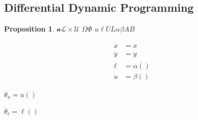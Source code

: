 \documentclass[conference]{IEEEtran}
\newtheorem{proposition}{Proposition}
\newcommand{\TODO}[1]{{\color{red} {{#1}}  }}
\begin{document}


\subsection{Differential Dynamic Programming}

\begin{proposition}
  $\mathcal{u}\mathcal{L} \times \mathcal{U}$ $\Omega \Phi$ $u \ell U L \alpha \beta A B $

\begin{align*}
  \dot x &= x \\
  \dot y &= y \\
  \dot\ell &= \alpha() \\
  \dot u &= \beta() 
\end{align*}

  $\dot{\theta}_u = u()$

  $\dot{\theta}_\ell = \ell()$
\end{proposition}
\end{document}

